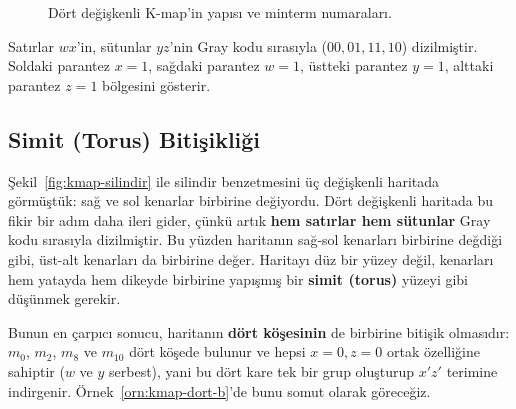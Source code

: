 \begin{figure}[H]
\centering
{}
\caption{Dört değişkenli K-map'in yapısı ve minterm numaraları.}
\label{fig:kmap-dort-yapi}
\end{figure}
Satırlar $wx$'in, sütunlar $yz$'nin Gray kodu sırasıyla ($00,01,11,10$) dizilmiştir.
Soldaki parantez $x=1$, sağdaki parantez $w=1$, üstteki parantez $y=1$, alttaki parantez
$z=1$ bölgesini gösterir.

\subsection{Simit (Torus) Bitişikliği}\label{sec:kmap-dort-simit}
\begin{bilginot}\label{bilginot:simit-torus}
Şekil~\ref{fig:kmap-silindir} ile silindir benzetmesini üç değişkenli haritada
görmüştük: sağ ve sol kenarlar birbirine değiyordu. Dört değişkenli haritada bu fikir bir
adım daha ileri gider, çünkü artık \textbf{hem satırlar hem sütunlar} Gray kodu sırasıyla
dizilmiştir. Bu yüzden haritanın sağ-sol kenarları birbirine değdiği gibi, üst-alt kenarları
da birbirine değer. Haritayı düz bir yüzey değil, kenarları hem yatayda hem dikeyde
birbirine yapışmış bir \textbf{simit (torus)} yüzeyi gibi düşünmek gerekir.

Bunun en çarpıcı sonucu, haritanın \textbf{dört köşesinin} de birbirine bitişik olmasıdır:
$m_0$, $m_2$, $m_8$ ve $m_{10}$ dört köşede bulunur ve hepsi $x=0,z=0$ ortak özelliğine
sahiptir ($w$ ve $y$ serbest), yani bu dört kare tek bir grup oluşturup $x'z'$ terimine
indirgenir. Örnek~\ref{orn:kmap-dort-b}'de bunu somut olarak göreceğiz.
\end{bilginot}


